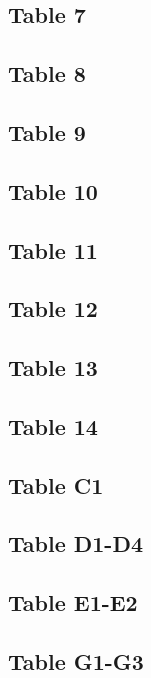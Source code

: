 \documentclass{article}
\begin{document}
\subsection{Table 7}

\subsection{Table 8}

\subsection{Table 9}

\subsection{Table 10}

\subsection{Table 11}

\subsection{Table 12}

\subsection{Table 13}

\subsection{Table 14}

\subsection{Table C1}

\subsection{Table D1-D4}

\subsection{Table E1-E2}

\subsection{Table G1-G3}
\end{document}
